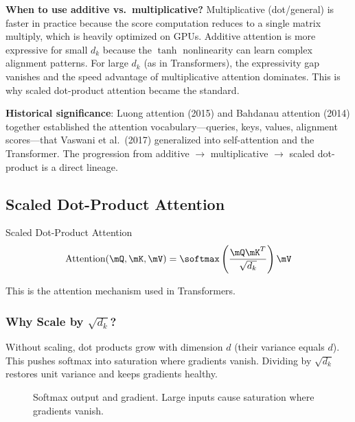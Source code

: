 \textbf{When to use additive vs.\ multiplicative?} Multiplicative (dot/general) is faster in practice because the score computation reduces to a single matrix multiply, which is heavily optimized on GPUs. Additive attention is more expressive for small $d_k$ because the $\tanh$ nonlinearity can learn complex alignment patterns. For large $d_k$ (as in Transformers), the expressivity gap vanishes and the speed advantage of multiplicative attention dominates. This is why scaled dot-product attention became the standard.

\textbf{Historical significance}: Luong attention (2015) and Bahdanau attention (2014) together established the attention vocabulary---queries, keys, values, alignment scores---that Vaswani et al.\ (2017) generalized into self-attention and the Transformer. The progression from additive $\to$ multiplicative $\to$ scaled dot-product is a direct lineage.

\subsection{Scaled Dot-Product Attention}

\begin{mathresult}{Scaled Dot-Product Attention}
\begin{equation}
\text{Attention}(\mQ, \mK, \mV) = \softmax\left(\frac{\mQ\mK^T}{\sqrt{d_k}}\right)\mV
\end{equation}
\end{mathresult}

This is the attention mechanism used in Transformers.

\subsubsection{Why Scale by $\sqrt{d_k}$?}

Without scaling, dot products grow with dimension $d$ (their variance equals $d$). This pushes softmax into saturation where gradients vanish. Dividing by $\sqrt{d_k}$ restores unit variance and keeps gradients healthy.

\begin{figure}[H]
\centering
{}
\caption{Softmax output and gradient. Large inputs cause saturation where gradients vanish.}
\label{fig:softmax_saturation}
\end{figure}


